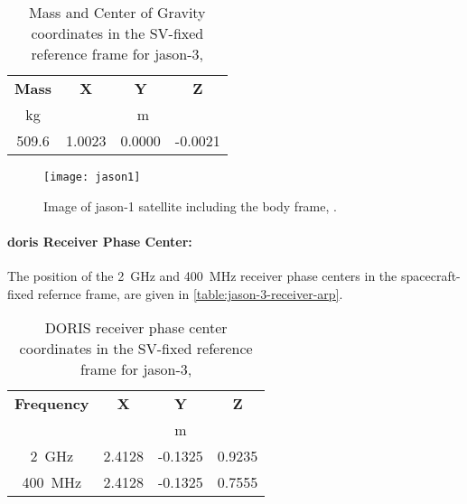 \begin{table}[h!]
    \centering
    \begin{tabular}{cccc}
        \toprule
        \textbf{Mass} & \textbf{X} & \textbf{Y} & \textbf{Z} \\
        \si{\kilo\gram} & \multicolumn{3}{c}{\si{\meter}} \\
        \hline
        509.6 & 1.0023 & 0.0000 & -0.0021 \\
       \bottomrule
    \end{tabular}
    \caption{Mass and Center of Gravity coordinates in the SV-fixed reference 
        frame for \gls{jason}-3, \cite{Cerri2022}}
    \label{table:jason-3-mass}
\end{table}

\begin{figure}
    \centering
    \texttt{[image: jason1]}
    \caption{Image of \gls{jason}-1 satellite including the body frame, \cite{Cerri2022}.}
    \label{fig:jason1}
  \end{figure}

\paragraph{\gls{doris} Receiver Phase Center:}
The position of the \SI{2}{\giga\hertz} and \SI{400}{\mega\hertz} receiver phase 
centers in the spacecraft-fixed refernce frame, are given in \autoref{table:jason-3-receiver-arp}.
\begin{table}[h!]
    \centering
    \begin{tabular}{cccc}
        \toprule
        \textbf{Frequency} & \textbf{X} & \textbf{Y} & \textbf{Z} \\
         & \multicolumn{3}{c}{\si{\meter}} \\
        \hline
        \SI{2}{\giga\hertz} &   2.4128 & -0.1325 & 0.9235 \\
        \SI{400}{\mega\hertz} & 2.4128 & -0.1325 & 0.7555 \\
       \bottomrule
    \end{tabular}
    \caption{DORIS receiver phase center coordinates in the SV-fixed reference 
        frame for \gls{jason}-3, \cite{Cerri2022}}
    \label{table:jason-3-receiver-arp}
\end{table}

